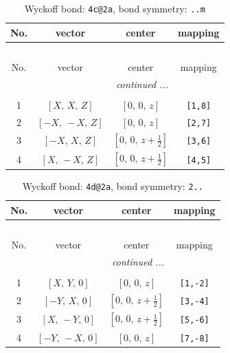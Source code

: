 \documentclass[fleqn,8pt]{jsarticle}
\begin{document}
\renewcommand{\arraystretch}{1.2}
\begin{longtable}{cccc}
\caption{Wyckoff bond: {\tt 4c@2a}, bond symmetry: {\tt ..m}}
 \\
 \hline \hline
No. & vector & center & mapping \\ \hline \endfirsthead

\multicolumn{3}{l}{\tablename\ \thetable{}} \\
 \hline \hline
No. & vector & center & mapping \\ \hline \endhead

 \hline \hline
\multicolumn{3}{r}{\footnotesize\it continued ...} \\ \endfoot

 \hline \hline
\multicolumn{3}{r}{} \\ \endlastfoot

1 & $\left[ X,\, X,\, Z \right]$ & $\left[ 0,\, 0,\, z \right]$ & {\tt [1,8]} \\ \hline
2 & $\left[ - X,\, - X,\, Z \right]$ & $\left[ 0,\, 0,\, z \right]$ & {\tt [2,7]} \\ \hline
3 & $\left[ - X,\, X,\, Z \right]$ & $\left[ 0,\, 0,\, z + \frac{1}{2} \right]$ & {\tt [3,6]} \\ \hline
4 & $\left[ X,\, - X,\, Z \right]$ & $\left[ 0,\, 0,\, z + \frac{1}{2} \right]$ & {\tt [4,5]} \\
\end{longtable}
\renewcommand{\arraystretch}{1.2}
\begin{longtable}{cccc}
\caption{Wyckoff bond: {\tt 4d@2a}, bond symmetry: {\tt 2..}}
 \\
 \hline \hline
No. & vector & center & mapping \\ \hline \endfirsthead

\multicolumn{3}{l}{\tablename\ \thetable{}} \\
 \hline \hline
No. & vector & center & mapping \\ \hline \endhead

 \hline \hline
\multicolumn{3}{r}{\footnotesize\it continued ...} \\ \endfoot

 \hline \hline
\multicolumn{3}{r}{} \\ \endlastfoot

1 & $\left[ X,\, Y,\, 0 \right]$ & $\left[ 0,\, 0,\, z \right]$ & {\tt [1,-2]} \\ \hline
2 & $\left[ - Y,\, X,\, 0 \right]$ & $\left[ 0,\, 0,\, z + \frac{1}{2} \right]$ & {\tt [3,-4]} \\ \hline
3 & $\left[ X,\, - Y,\, 0 \right]$ & $\left[ 0,\, 0,\, z + \frac{1}{2} \right]$ & {\tt [5,-6]} \\ \hline
4 & $\left[ - Y,\, - X,\, 0 \right]$ & $\left[ 0,\, 0,\, z \right]$ & {\tt [7,-8]} \\
\end{longtable}
\end{document}
